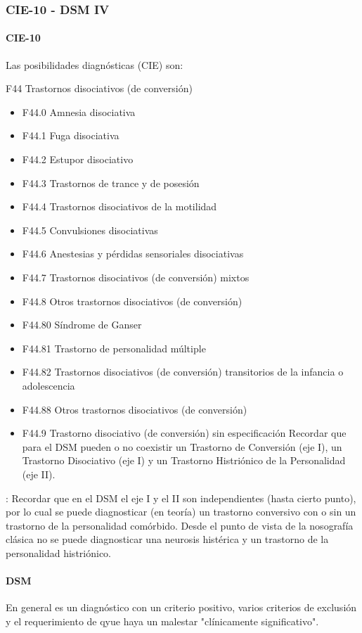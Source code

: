 \subsubsection*{CIE-10 - DSM IV}
\paragraph{CIE-10}
Las posibilidades diagnósticas (CIE) son:

F44 Trastornos disociativos (de conversión)
\begin{itemize}
	\item F44.0 Amnesia disociativa
	\item F44.1 Fuga disociativa
	\item F44.2 Estupor disociativo
	\item F44.3 Trastornos de trance y de posesión
	\item F44.4 Trastornos disociativos de la motilidad
	\item F44.5 Convulsiones disociativas
	\item F44.6 Anestesias y pérdidas sensoriales disociativas
	\item F44.7 Trastornos disociativos (de conversión) mixtos
	\item F44.8 Otros trastornos disociativos (de conversión)
	\item F44.80 Síndrome de Ganser
	\item F44.81 Trastorno de personalidad múltiple
	\item F44.82 Trastornos disociativos (de conversión) transitorios de la infancia o adolescencia
	\item F44.88 Otros trastornos disociativos (de conversión)
	\item F44.9 Trastorno disociativo (de conversión) sin especificación Recordar que para el DSM pueden o no coexistir un Trastorno de Conversión (eje I), un Trastorno Disociativo (eje I) y un Trastorno Histriónico de la Personalidad (eje II).
\end{itemize}

\faLightbulb: Recordar que en el DSM el eje I y el II son independientes (hasta cierto punto), por lo cual se puede diagnosticar (en teoría) un trastorno conversivo con o sin un trastorno de la personalidad comórbido. Desde el punto de vista de la nosografía clásica no se puede diagnosticar una neurosis histérica y un trastorno de la personalidad histriónico.

\paragraph{DSM}
En general es un diagnóstico con un criterio positivo, varios criterios de exclusión y el requerimiento de qyue haya un malestar "clínicamente significativo".


